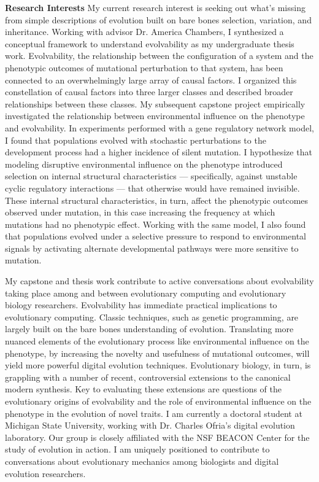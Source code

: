 \textbf{Research Interests}
My current research interest is seeking out what's missing from simple descriptions of evolution built on bare bones selection, variation, and inheritance.
Working with advisor Dr. America Chambers, I synthesized a conceptual framework to understand evolvability as my undergraduate thesis work.
Evolvability, the relationship between the configuration of a system and the phenotypic outcomes of mutational perturbation to that system, has been connected to an overwhelmingly large array of causal factors.
I organized this constellation of causal factors into three larger classes and described broader relationships between these classes.
My subsequent capstone project empirically investigated the relationship between environmental influence on the phenotype and evolvability.
In experiments performed with a gene regulatory network model, I found that populations evolved with stochastic perturbations to the development process had a higher incidence of silent mutation.
I hypothesize that modeling disruptive environmental influence on the phenotype introduced selection on internal structural characteristics --- specifically, against unstable cyclic regulatory interactions --- that otherwise would have remained invisible.
These internal structural characteristics, in turn, affect the phenotypic outcomes observed under mutation, in this case increasing the frequency at which mutations had no phenotypic effect.
Working with the same model, I also found that populations evolved under a selective pressure to respond to environmental signals by activating alternate developmental pathways were more sensitive to mutation.

My capstone and thesis work contribute to active conversations about evolvability taking place among and between evolutionary computing and evolutionary biology researchers.
Evolvability has immediate practical implications to evolutionary computing.
Classic techniques, such as genetic programming, are largely built on the bare bones understanding of evolution.
Translating more nuanced elements of the evolutionary process like environmental influence on the phenotype, by increasing the novelty and usefulness of mutational outcomes, will yield more powerful digital evolution techniques.
Evolutionary biology, in turn, is grappling with a number of recent, controversial extensions to the canonical modern synthesis.
Key to evaluating these extensions are questions of the evolutionary origins of evolvability and the role of environmental influence on the phenotype in the evolution of novel traits.
I am currently a doctoral student at Michigan State University, working with Dr. Charles Ofria's digital evolution laboratory.
Our group is closely affiliated with the NSF BEACON Center for the study of evolution in action.
I am uniquely positioned to contribute to conversations about evolutionary mechanics among biologists and digital evolution researchers.
